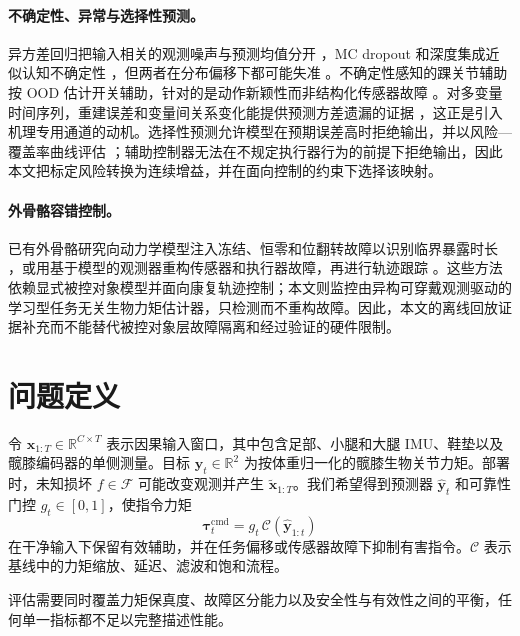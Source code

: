 \documentclass[UTF8]{ctexart}
\begin{document}
\paragraph{不确定性、异常与选择性预测。}
异方差回归把输入相关的观测噪声与预测均值分开 \citep{kendall2017uncertainties}，MC dropout 和深度集成近似认知不确定性 \citep{gal2016dropout,lakshminarayanan2017ensembles}，但两者在分布偏移下都可能失准 \citep{ovadia2019trust}。不确定性感知的踝关节辅助按 OOD 估计开关辅助，针对的是动作新颖性而非结构化传感器故障 \citep{tourk2025uncertainty}。对多变量时间序列，重建误差和变量间关系变化能提供预测方差遗漏的证据 \citep{song2023memto,dai2024sarad}，这正是引入机理专用通道的动机。选择性预测允许模型在预期误差高时拒绝输出，并以风险—覆盖率曲线评估 \citep{geifman2019selectivenet}；辅助控制器无法在不规定执行器行为的前提下拒绝输出，因此本文把标定风险转换为连续增益，并在面向控制的约束下选择该映射。

\paragraph{外骨骼容错控制。}
已有外骨骼研究向动力学模型注入冻结、恒零和位翻转故障以识别临界暴露时长 \citep{fabarisov2020fault}，或用基于模型的观测器重构传感器和执行器故障，再进行轨迹跟踪 \citep{mokhtari2022fault,sun2025reconstruction}。这些方法依赖显式被控对象模型并面向康复轨迹控制；本文则监控由异构可穿戴观测驱动的学习型任务无关生物力矩估计器，只检测而不重构故障。因此，本文的离线回放证据补充而不能替代被控对象层故障隔离和经过验证的硬件限制。

\section{问题定义}

令 $\mathbf{x}_{1:T}\in\mathbb{R}^{C\times T}$ 表示因果输入窗口，其中包含足部、小腿和大腿 IMU、鞋垫以及髋膝编码器的单侧测量。目标 $\mathbf{y}_{t}\in\mathbb{R}^{2}$ 为按体重归一化的髋膝生物关节力矩。部署时，未知损坏 $f\in\mathcal{F}$ 可能改变观测并产生 $\widetilde{\mathbf{x}}_{1:T}$。我们希望得到预测器 $\widehat{\mathbf{y}}_t$ 和可靠性门控 $g_t\in[0,1]$，使指令力矩
\begin{equation}
    \boldsymbol{\tau}^{\mathrm{cmd}}_t
    = g_t\,\mathcal{C}(\widehat{\mathbf{y}}_{1:t})
\end{equation}
在干净输入下保留有效辅助，并在任务偏移或传感器故障下抑制有害指令。$\mathcal{C}$ 表示基线中的力矩缩放、延迟、滤波和饱和流程。

评估需要同时覆盖力矩保真度、故障区分能力以及安全性与有效性之间的平衡，任何单一指标都不足以完整描述性能。
\end{document}
